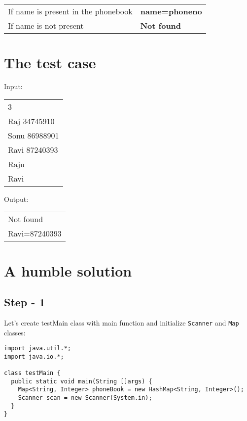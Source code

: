 \documentclass[11pt]{article}
\begin{document}
\begin{center}
\begin{tabular}{ll}
If name is present in the phonebook & \textbf{name=phoneno}\\
If name is not present & \textbf{Not found}\\
\end{tabular}
\end{center}

\section{The test case}
\label{sec:orgdd76ab4}

Input:

\begin{center}
\begin{tabular}{l}
3\\
Raj 34745910\\
Sonu 86988901\\
Ravi 87240393\\
Raju\\
Ravi\\
\end{tabular}
\end{center}

Output:

\begin{center}
\begin{tabular}{l}
Not found\\
Ravi=87240393\\
\end{tabular}
\end{center}

\section{A humble solution}
\label{sec:orgc469043}

\subsection{Step - 1}
\label{sec:org49f5733}

Let’s create testMain class with main function and initialize \texttt{Scanner} and \texttt{Map}
classes:

\begin{verbatim}
import java.util.*;
import java.io.*;

class testMain {
  public static void main(String []args) {
    Map<String, Integer> phoneBook = new HashMap<String, Integer>();
    Scanner scan = new Scanner(System.in);
  }
}    
\end{verbatim}
\end{document}
